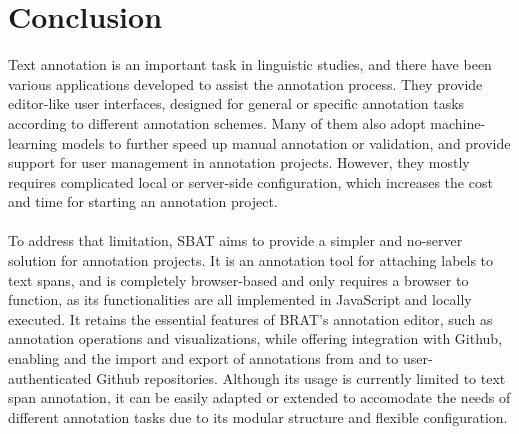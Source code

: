 \documentclass[12ptm a4paper]{article}
\begin{document}
\section{Conclusion}
Text annotation is an important task in linguistic studies, and there have been various applications developed to assist the annotation process. They provide editor-like user interfaces, designed for general or specific annotation tasks according to different annotation schemes. Many of them also adopt machine-learning models to further speed up manual annotation or validation, and provide support for user management in annotation projects. However, they mostly requires complicated local or server-side configuration, which increases the cost and time for starting an annotation project.\\
\\
To address that limitation, SBAT aims to provide a simpler and no-server solution for annotation projects. It is an annotation tool for attaching labels to text spans, and is completely browser-based and only requires a browser to function, as its functionalities are all implemented in JavaScript and locally executed. It retains the essential features of BRAT's annotation editor, such as annotation operations and visualizations, while offering integration with Github, enabling and the import and export of annotations from and to user-authenticated Github repositories. Although its usage is currently limited to text span annotation, it can be easily adapted or extended to accomodate the needs of different annotation tasks due to its modular structure and flexible configuration.\\ 










\newpage


\end{document}
